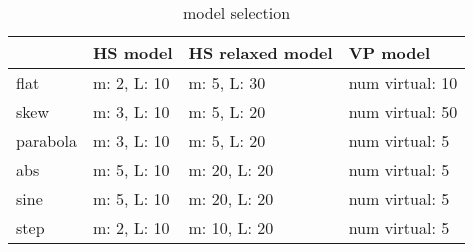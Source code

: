 \begin{table}[] 
 \centering
\begin{tabular}{llll}
\hline
 & HS model & HS relaxed model & VP model \\
\hline
flat & m: 2, L: 10 & m: 5, L: 30 & num virtual: 10 \\
skew & m: 3, L: 10 & m: 5, L: 20 & num virtual: 50 \\
parabola & m: 3, L: 10 & m: 5, L: 20 & num virtual: 5 \\
abs & m: 5, L: 10 & m: 20, L: 20 & num virtual: 5 \\
sine & m: 5, L: 10 & m: 20, L: 20 & num virtual: 5 \\
step & m: 2, L: 10 & m: 10, L: 20 & num virtual: 5 \\
\hline
\end{tabular}
\caption{model selection}
\label{tab:my_label}
\end{table}
